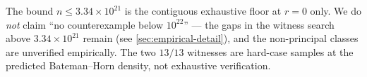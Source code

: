 \begin{remark}
The bound $n \le 3.34 \times 10^{21}$ is the contiguous exhaustive
floor at $r = 0$ only. We do \emph{not} claim
``no counterexample below $10^{22}$'' --- the gaps in the witness
search above $3.34 \times 10^{21}$ remain (see
\cref{sec:empirical-detail}), and the non-principal classes are
unverified empirically. The two $13/13$ witnesses are hard-case
samples at the predicted Bateman--Horn density, not exhaustive
verification.
\end{remark}


